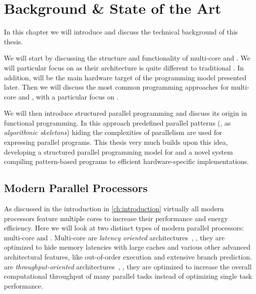 
\chapter{Background \& State of the Art} %

\label{chapter:background}
\label{chapter:state-of-the-art}

In this chapter we will introduce and discuss the technical background of this thesis.

We will start by discussing the structure and functionality of multi-core \CPUs and \GPUs.
We will particular focus on \GPUs as their architecture is quite different to traditional \CPUs.
In addition, \GPUs will be the main hardware target of the \SkelCL programming model presented later.
Then we will discuss the most common programming approaches for multi-core \CPUs and \GPUs, with a particular focus on \OpenCL.

We will then introduce structured parallel programming and discuss its origin in functional programming.
In this approach predefined parallel patterns (\aka, as \emph{algorithmic skeletons}) hiding the complexities of parallelism are used for expressing parallel programs.
This thesis very much builds upon this idea, developing a structured parallel programming model for \GPUs and a novel system compiling pattern-based programs to efficient hardware-specific implementations.

\section{Modern Parallel Processors}
As discussed in the introduction in \autoref{ch:introduction} virtually all modern processors feature multiple cores to increase their performance and energy efficiency.
Here we will look at two distinct types of modern parallel processors: multi-core \CPUs and \GPUs.
Multi-core \CPUs are \emph{latency oriented} architectures~\cite{GarlandK10}, \ie, they are optimized to hide memory latencies with large caches and various other advanced architectural features, like out-of-order execution and extensive branch prediction.
\GPUs are \emph{throughput-oriented} architectures~\cite{GarlandK10}, \ie, they are optimized to increase the overall computational throughput of many parallel tasks instead of optimizing single task performance.


